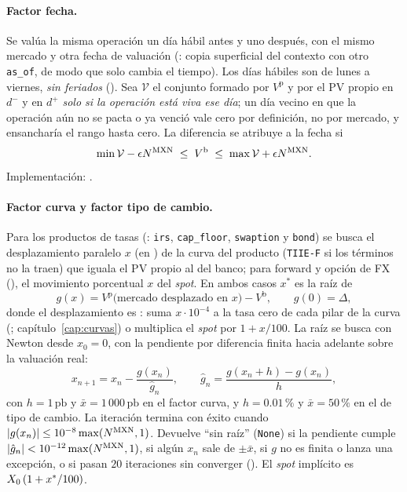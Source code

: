 \paragraph{Factor fecha.} Se valúa la misma operación un día hábil antes y uno después, con el mismo mercado y otra fecha de valuación (: copia superficial del contexto con otro \texttt{as\_of}, de modo que solo cambia el tiempo). Los días hábiles son de lunes a viernes, \emph{sin feriados} (). Sea $\mathcal{V}$ el conjunto formado por $V^{\mathrm{p}}$ y por el PV propio en $d^{-}$ y en $d^{+}$ \emph{solo si la operación está viva ese día}; un día vecino en que la operación aún no se pacta o ya venció vale cero por definición, no por mercado, y ensancharía el rango hasta cero. La diferencia se atribuye a la fecha si
\begin{equation}\label{eq:cap11-fecha}
  \min\mathcal{V} - \epsilon N^{\textup{MXN}} \;\le\; V^{\mathrm{b}} \;\le\; \max\mathcal{V} + \epsilon N^{\textup{MXN}}.
\end{equation}
Implementación: .

\paragraph{Factor curva y factor tipo de cambio.} Para los productos de tasas (: \texttt{irs}, \texttt{cap\_floor}, \texttt{swaption} y \texttt{bond}) se busca el desplazamiento paralelo $x$ (en \pb) de la curva del producto (\texttt{TIIE-F} si los términos no la traen) que iguala el PV propio al del banco; para forward y opción de FX (), el movimiento porcentual $x$ del \emph{spot}. En ambos casos $x^{*}$ es la raíz de
\begin{equation}\label{eq:cap11-raiz}
  g(x) = V^{\mathrm{p}}\bigl(\text{mercado desplazado en } x\bigr) - V^{\mathrm{b}}, \qquad g(0) = \Delta,
\end{equation}
donde el desplazamiento es : suma $x\cdot 10^{-4}$ a la tasa cero de cada pilar de la curva (; capítulo~\ref{cap:curvas}) o multiplica el \emph{spot} por $1 + x/100$. La raíz se busca con Newton desde $x_0 = 0$, con la pendiente por diferencia finita hacia adelante sobre la valuación real:
\begin{equation}\label{eq:cap11-newton}
  x_{n+1} = x_n - \frac{g(x_n)}{\hat{g}_n}, \qquad
  \hat{g}_n = \frac{g(x_n + h) - g(x_n)}{h},
\end{equation}
con $h = 1\,\mathrm{pb}$ y $\bar{x} = 1\,000\,\mathrm{pb}$ en el factor curva, y $h = 0.01\,\%$ y $\bar{x} = 50\,\%$ en el de tipo de cambio. La iteración termina con éxito cuando $|g(x_n)| \le 10^{-8}\max(N^{\textup{MXN}}, 1)$. Devuelve ``sin raíz'' (\texttt{None}) si la pendiente cumple $|\hat{g}_n| < 10^{-12}\max(N^{\textup{MXN}}, 1)$, si algún $x_n$ sale de $\pm\bar{x}$, si $g$ no es finita o lanza una excepción, o si pasan $20$ iteraciones sin converger (). El \emph{spot} implícito es $X_0\,(1 + x^{*}/100)$.

